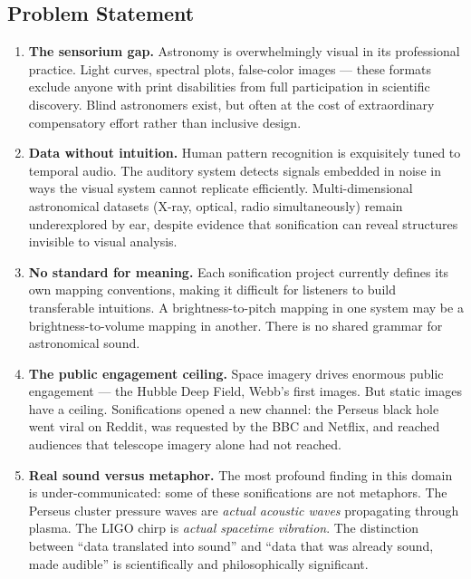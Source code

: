 \documentclass[11pt,letterpaper]{article}
\begin{document}
\subsection{Problem Statement}

\begin{enumerate}
  \item \textbf{The sensorium gap.} Astronomy is overwhelmingly visual in its professional practice. Light curves, spectral plots, false-color images — these formats exclude anyone with print disabilities from full participation in scientific discovery. Blind astronomers exist, but often at the cost of extraordinary compensatory effort rather than inclusive design.

  \item \textbf{Data without intuition.} Human pattern recognition is exquisitely tuned to temporal audio. The auditory system detects signals embedded in noise in ways the visual system cannot replicate efficiently. Multi-dimensional astronomical datasets (X-ray, optical, radio simultaneously) remain underexplored by ear, despite evidence that sonification can reveal structures invisible to visual analysis.

  \item \textbf{No standard for meaning.} Each sonification project currently defines its own mapping conventions, making it difficult for listeners to build transferable intuitions. A brightness-to-pitch mapping in one system may be a brightness-to-volume mapping in another. There is no shared grammar for astronomical sound.

  \item \textbf{The public engagement ceiling.} Space imagery drives enormous public engagement — the Hubble Deep Field, Webb's first images. But static images have a ceiling. Sonifications opened a new channel: the Perseus black hole went viral on Reddit, was requested by the BBC and Netflix, and reached audiences that telescope imagery alone had not reached.

  \item \textbf{Real sound versus metaphor.} The most profound finding in this domain is under-communicated: some of these sonifications are not metaphors. The Perseus cluster pressure waves are \emph{actual acoustic waves} propagating through plasma. The LIGO chirp is \emph{actual spacetime vibration}. The distinction between ``data translated into sound'' and ``data that was already sound, made audible'' is scientifically and philosophically significant.
\end{enumerate}
\end{document}
